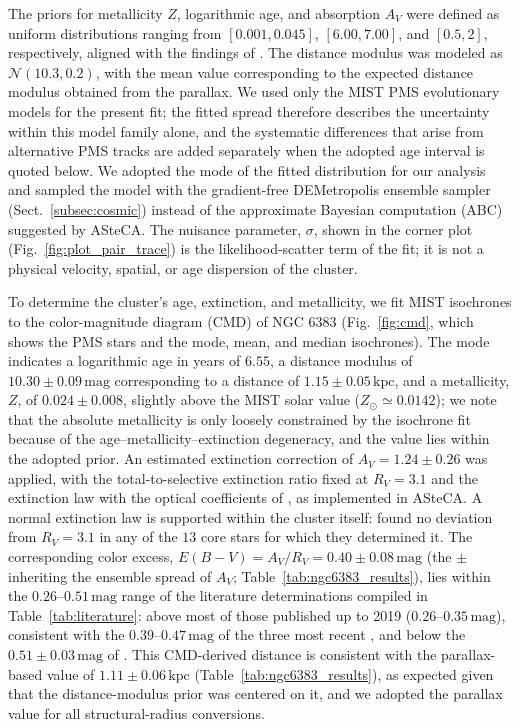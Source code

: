 \documentclass{aa}
\begin{document}
The priors for metallicity $Z$, logarithmic age, and absorption $A_V$ were defined as uniform distributions ranging from $[0.001, 0.045]$, $[6.00, 7.00]$, and $[0.5, 2]$, respectively, aligned with the findings of \citet{2024arXiv240301030P}. The distance modulus was modeled as $\mathcal{N}(10.3, 0.2)$, with the mean value corresponding to the expected distance modulus obtained from the parallax. We used only the MIST PMS evolutionary models for the present fit; the fitted spread therefore describes the uncertainty within this model family alone, and the systematic differences that arise from alternative PMS tracks are added separately when the adopted age interval is quoted below. We adopted the mode of the fitted distribution for our analysis and sampled the model with the gradient-free DEMetropolis ensemble sampler (Sect.~\ref{subsec:cosmic}) instead of the approximate Bayesian computation (ABC) suggested by ASteCA\@. The nuisance parameter, $\sigma$, shown in the corner plot (Fig.~\ref{fig:plot_pair_trace}) is the likelihood-scatter term of the fit; it is not a physical velocity, spatial, or age dispersion of the cluster.

To determine the cluster's age, extinction, and metallicity, we fit MIST isochrones to the color-magnitude diagram (CMD) of NGC 6383 (Fig.~\ref{fig:cmd}, which shows the PMS stars and the mode, mean, and median isochrones). The mode indicates a logarithmic age in years of $6.55$, a distance modulus of $10.30\pm 0.09\,\mathrm{mag}$ corresponding to a distance of $1.15\pm0.05\,\mathrm{kpc}$, and a metallicity, $Z $, of $0.024 \pm 0.008$, slightly above the MIST solar value ($Z_\odot\simeq0.0142$); we note that the absolute metallicity is only loosely constrained by the isochrone fit because of the age--metallicity--extinction degeneracy, and the value lies within the adopted prior. An estimated extinction correction of $A_V = 1.24 \pm 0.26$ was applied, with the total-to-selective extinction ratio fixed at $R_V = 3.1$ and the \citet{1989ApJ...345..245C} extinction law with the optical coefficients of \citet{1994ApJ...422..158O}, as implemented in ASteCA\@. A normal extinction law is supported within the cluster itself: \citet{2000AA...362..580V} found no deviation from $R_V = 3.1$ in any of the $13$ core stars for which they determined it. The corresponding color excess, $E(B-V) = A_V/R_V = 0.40 \pm 0.08\,\mathrm{mag}$ (the $\pm$ inheriting the ensemble spread of $A_V$; Table~\ref{tab:ngc6383_results}), lies within the $0.26$--$0.51\,\mathrm{mag}$ range of the literature determinations compiled in Table~\ref{tab:literature}: above most of those published up to 2019 ($0.26$--$0.35\,\mathrm{mag}$), consistent with the $0.39$--$0.47\,\mathrm{mag}$ of the three most recent \citep{2022ApJS..262....7H,2024arXiv240305143H,2024arXiv240301030P}, and below the $0.51 \pm 0.03\,\mathrm{mag}$ of \citet{2018AA...610A..30A}. This CMD-derived distance is consistent with the parallax-based value of $1.11 \pm 0.06\,\mathrm{kpc}$ (Table~\ref{tab:ngc6383_results}), as expected given that the distance-modulus prior was centered on it, and we adopted the parallax value for all structural-radius conversions.
\end{document}
